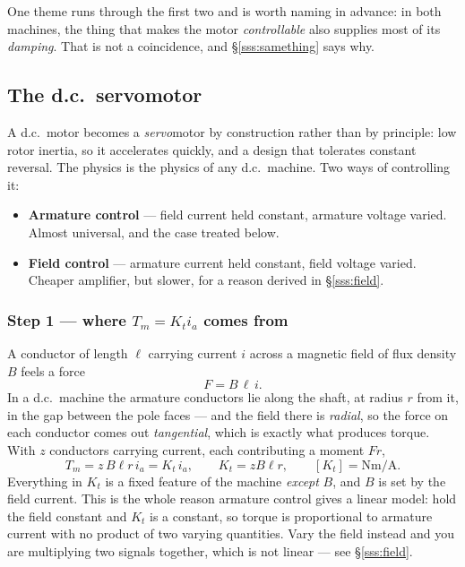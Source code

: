 \documentclass[11pt,a4paper]{article}
\begin{document}
One theme runs through the first two and is worth naming in advance: in both
machines, the thing that makes the motor \emph{controllable} also supplies
most of its \emph{damping}. That is not a coincidence, and \S\ref{sss:samething}
says why.

\subsection{The d.c.\ servomotor}

A d.c.\ motor becomes a \emph{servo}motor by construction rather than by
principle: low rotor inertia, so it accelerates quickly, and a design that
tolerates constant reversal. The physics is the physics of any d.c.\ machine.
Two ways of controlling it:

\begin{itemize}[leftmargin=1.5em,itemsep=2pt]
\item \textbf{Armature control} --- field current held constant, armature
      voltage varied. Almost universal, and the case treated below.
\item \textbf{Field control} --- armature current held constant, field voltage
      varied. Cheaper amplifier, but slower, for a reason derived in
      \S\ref{sss:field}.
\end{itemize}

\subsubsection{Step 1 --- where $T_{m}=K_{t}i_{a}$ comes from}
\label{sss:torqueconst}

A conductor of length $\ell$ carrying current $i$ across a magnetic field of
flux density $B$ feels a force
\[
  F=B\,\ell\,i .
\]
In a d.c.\ machine the armature conductors lie along the shaft, at radius $r$
from it, in the gap between the pole faces --- and the field there is
\emph{radial}, so the force on each conductor comes out \emph{tangential},
which is exactly what produces torque. With $z$ conductors carrying current,
each contributing a moment $Fr$,
\begin{equation}
  T_{m}=z\,B\ell r\,i_{a}=K_{t}\,i_{a},
  \qquad K_{t}=z B\ell r,\qquad [K_{t}]=\si{\newton\metre\per\ampere}.
  \label{eq:torqueconst}
\end{equation}
Everything in $K_{t}$ is a fixed feature of the machine \emph{except} $B$, and
$B$ is set by the field current. This is the whole reason armature control
gives a linear model: hold the field constant and $K_{t}$ is a constant, so
torque is proportional to armature current with no product of two varying
quantities. Vary the field instead and you are multiplying two signals
together, which is not linear --- see \S\ref{sss:field}.
\end{document}
